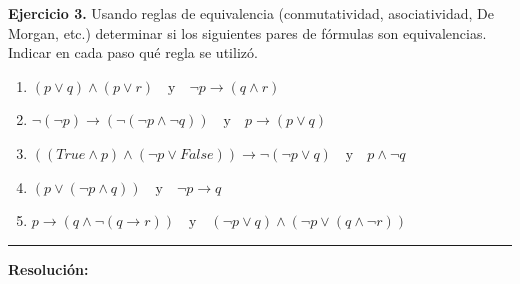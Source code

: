 \hypertarget{ej3}{}
\noindent \textbf{Ejercicio 3.} Usando reglas de equivalencia (conmutatividad, asociatividad, De Morgan, etc.) determinar si los siguientes pares de fórmulas son equivalencias. Indicar en cada paso qué regla se utilizó.

\begin{enumerate}[label=\alph*)]
    \item $(p \vee q) \wedge (p \vee r) \quad \text{y} \quad \neg p \rightarrow (q \wedge r)$
    \item $\neg(\neg p) \rightarrow (\neg(\neg p \wedge \neg q)) \quad \text{y} \quad p \rightarrow (p \vee q)$
    \item $((True \wedge p) \wedge (\neg p \vee False)) \rightarrow \neg(\neg p \vee q) \quad \text{y} \quad p \wedge \neg q$
    \item $(p \vee (\neg p \wedge q)) \quad \text{y} \quad \neg p \rightarrow q$
    \item $p \rightarrow (q \wedge \neg(q \rightarrow r)) \quad \text{y} \quad (\neg p \vee q) \wedge (\neg p \vee (q \wedge \neg r))$
\end{enumerate}

\vspace{0.2cm}
{\color{gray}\hrule}
\vspace{0.4cm}

\textbf{Resolución:}

